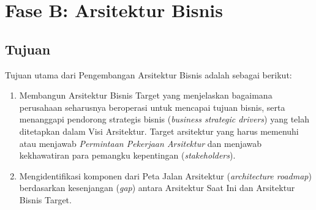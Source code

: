 \chapter{Fase B: Arsitektur Bisnis}

\section{Tujuan}
Tujuan utama dari Pengembangan Arsitektur Bisnis adalah sebagai berikut:
\begin{enumerate}
	\item Membangun Arsitektur Bisnis Target yang menjelaskan bagaimana perusahaan seharusnya beroperasi untuk mencapai tujuan bisnis, serta menanggapi pendorong strategis bisnis (\textit{business strategic drivers}) yang telah ditetapkan dalam Visi Arsitektur. Target arsitektur yang harus memenuhi atau menjawab \textit{Permintaan Pekerjaan Arsitektur} dan menjawab kekhawatiran para pemangku kepentingan (\textit{stakeholders}).
	\item Mengidentifikasi komponen dari Peta Jalan Arsitektur (\textit{architecture roadmap}) berdasarkan kesenjangan (\textit{gap}) antara Arsitektur Saat Ini dan Arsitektur Bisnis Target.
\end{enumerate}

